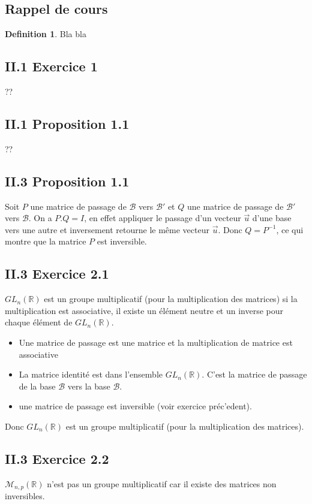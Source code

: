\documentclass[]{book}
\theoremstyle{definition}
\newtheorem{defn}{Definition}
\newcommand{\bb}[1]{\mathbb{#1}}
\newcommand{\R}{\bb{R}}
\newcommand{\vect}[1]{\overrightarrow{#1}}
\begin{document}
\subsection*{Rappel de cours}
\begin{defn}
Bla bla
\end{defn}



\newpage
\subsection*{II.1 Exercice 1}
??
\subsection*{II.1 Proposition 1.1}
??

\subsection*{II.3 Proposition 1.1}
Soit $P$ une matrice de passage de $\mathcal{B}$ vers $\mathcal{B'}$ et $Q$ une matrice de passage de $\mathcal{B'}$ vers $\mathcal{B}$. On a $P.Q = I$, en effet appliquer le passage d'un vecteur $\vect{u}$ d'une base vers une autre et inversement retourne le m\^eme vecteur $\vect{u}$. Donc $Q=P^{-1}$, ce qui montre que la matrice $P$ est inversible.

\subsection*{II.3 Exercice 2.1}
$GL_n(\R)$ est un groupe multiplicatif (pour la multiplication des matrices) si la multiplication est associative, il existe un \'el\'ement neutre et un inverse pour chaque \'el\'ement de $GL_n(\R)$. 
\begin{itemize}
\item Une matrice de passage est une matrice et la multiplication de matrice est associative
\item La matrice identit\'e est dans l'ensemble $GL_n(\R)$. C'est la matrice de passage de la base $\mathcal{B}$ vers la base $\mathcal{B}$.
\item une matrice de passage est inversible (voir exercice pr\'ec'edent).
\end{itemize}

Donc $GL_n(\R)$ est un groupe multiplicatif (pour la multiplication des matrices).

\subsection*{II.3 Exercice 2.2}
$\mathcal{M}_{n,p}(\R)$ n'est pas un groupe multiplicatif car il existe des matrices non inversibles. \\
\end{document}
